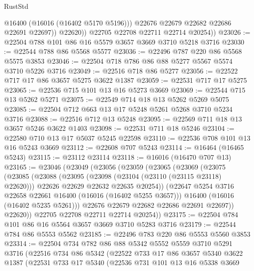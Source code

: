\begin{lexlean}{RustStd}
\begin{coremodule}
                  @16400
                  (@16016 (@16402 @5170 @5196)))
                @22676
                @22679
                @22682
                @22686
                @22691
                @22697))
            @22620))
        @22705
        @22708
        @22711
        @22714
        @20254))
@23026 := @22504 @788 @101 @86 @16 @5579 @3657 @3669 @3710 @5218 @3716
@23030 := @22544 @788 @86 @5568 @5577
@23036 := @22496 @787 @220 @86 @5568 @5575 @3853
@23046 := @22504 @718 @786 @86 @88 @5277 @5567 @5574 @3710 @5226 @3716
@23049 := @22516 @718 @86 @5277
@23056 := @22522 @717 @17 @86 @3657 @5275 @3622 @1387
@23059 := @22531 @717 @17 @5275
@23065 := @22536 @715 @101 @13 @16 @5273 @3669
@23069 := @22544 @715 @13 @5262 @5271
@23075 := @22549 @714 @18 @13 @5262 @5269 @5075
@23085 := @22504 @712 @663 @13 @17 @5248 @5261 @5268 @3710 @5234 @3716
@23088 := @22516 @712 @13 @5248
@23095 := @22569 @711 @18 @13 @3657 @5246 @3622 @1403
@23098 := @22531 @711 @18 @5246
@23104 := @22580 @710 @13 @17 @5037 @5245 @22598
@23110 := @22536 @708 @101 @13 @16 @5243 @3669
@23112 := @22608 @707 @5243
@23114 := @16464 (@16465 @5243)
@23115 := @23112 @23114
@23118 := @16016 (@16470 @707 @13)
@23165 := @23046
    (@23049
      (@23056
        (@23059
          (@23065
            (@23069
              (@23075
                (@23085
                  (@23088
                    (@23095
                      (@23098 (@23104 (@23110 (@23115 @23118) @22620)))
                      @22626
                      @22629
                      @22632
                      @22635
                      @20254))
                  (@22647 @5254 @3716 @22658 @22661 @16400 (@16016 (@16402 @5255 @3657)))
                  @16400
                  (@16016 (@16402 @5235 @5261)))
                @22676
                @22679
                @22682
                @22686
                @22691
                @22697))
            @22620))
        @22705
        @22708
        @22711
        @22714
        @20254))
@23175 := @22504 @784 @101 @86 @16 @5564 @3657 @3669 @3710 @5283 @3716
@23179 := @22544 @784 @86 @5553 @5562
@23185 := @22496 @783 @220 @86 @5553 @5560 @3853
@23314 := @22504
    @734
    @782
    @86
    @88
    @5342
    @5552
    @5559
    @3710
    @5291
    @3716
    (@22516
      @734
      @86
      @5342
      (@22522
        @733
        @17
        @86
        @3657
        @5340
        @3622
        @1387
        (@22531
          @733
          @17
          @5340
          (@22536
            @731
            @101
            @13
            @16
            @5338
            @3669

\end{coremodule}
\end{lexlean}
